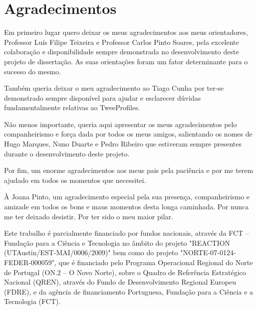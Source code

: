 \chapter*{Agradecimentos}

Em primeiro lugar quero deixar os meus agradecimentos aos meus orientadores, Professor Luís Filipe Teixeira e Professor Carlos Pinto Soares, pela excelente colaboração e disponibilidade sempre demonstrada no desenvolvimento deste projeto de dissertação. As suas orientações foram um fator determinante para o sucesso do mesmo. 

Também queria deixar o meu agradecimento ao Tiago Cunha por ter-se demonstrado sempre disponível para ajudar e esclarecer dúvidas fundamentalmente relativas ao TweeProfiles.

Não menos importante, queria aqui apresentar os meus agradecimentos pelo companheirismo e força dada por todos os meus amigos, salientando os nomes de Hugo Marques, Nuno Duarte e Pedro Ribeiro que estiveram sempre presentes durante o desenvolvimento deste projeto.

Por fim, um enorme agradecimentos aos meus pais pela paciência e por me terem ajudado em todos os momentos que necessitei.

\vspace{5mm}
À Joana Pinto, um agradecimento especial pela sua presença, companheirismo e amizade em todos os bons e maus momentos desta longa caminhada. Por nunca me ter deixado desistir. Por ter sido o meu maior pilar.

\vspace{10mm}

\vfill

Este trabalho é parcialmente financiado por fundos nacionais, através da FCT – Fundação para a Ciência e Tecnologia no âmbito do projeto "REACTION (UTAustin/EST-MAI/0006/2009)" bem como do projeto "NORTE-07-0124-FEDER-000059", que é financiado pelo Programa Operacional Regional do Norte de Portugal (ON.2 – O Novo Norte), sobre o Quadro de Referência Estratégico Nacional (QREN), através do Fundo de Desenvolvimento Regional Europeu (FDRE), e da agência de financiamento Portuguesa, Fundação para a Ciência e a Tecnologia (FCT).

